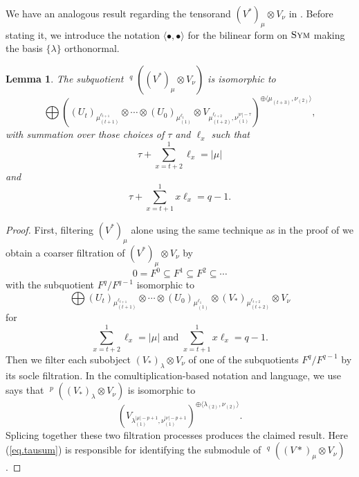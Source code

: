 \documentclass[11pt]{article}
\theoremstyle{plain}
\newtheorem{lemma}{Lemma}[section]
\theoremstyle{nonumberplain}
\theoremstyle{plain}
\theoremstyle{nonumberplain}
\newtheorem{proof}{Proof}
\DeclareMathOperator{\usoc}{\underline{\mathrm{soc}}}
\DeclareMathOperator{\sym}{\cat{Sym}}
\newcommand{\cat}[1]{\textsc{#1}}
\begin{document}
We have an analogous result regarding the tensorand $(V^*)_\mu\otimes V_\nu$ in . Before stating it, we introduce the notation $\langle\bullet,\bullet\rangle$ for the bilinear form on $\sym$ making the basis $\{\lambda\}$ orthonormal. 



\begin{lemma}\label{le.quot_filt'}
  The subquotient  $\usoc^q\left((V^*)_\mu\otimes V_\nu\right)$ is isomorphic to 
  \begin{equation*}
    \bigoplus\left((U_t)_{\mu_{(t+1)}^{\ell_{t+1}}} \otimes\cdots\otimes (U_0)_{\mu_{(1)}^{\ell_1}}\otimes V_{\mu_{(t+2)}^{\ell_{t+2}},\nu_{(1)}^{|\nu|-\tau}}\right)^{\oplus \langle\mu_{(t+3)},\nu_{(2)}\rangle},
  \end{equation*}
with summation over those choices of $\tau$ and $\ell_x$ such that
\begin{equation*}
\tau+\sum^{1}_{x=t+2}\ell_x=|\mu|
\end{equation*}
 and 
 \begin{equation}\label{eq.tausum}
 \tau+\sum^{1}_{x=t+1}x\ell_x=q-1.
\end{equation}
\end{lemma}
\begin{proof}
First, filtering $(V^*)_\mu$ alone using the same
  technique as in the proof of  we
  obtain a coarser filtration of $(V^*)_\mu\otimes V_\nu$ by
  \begin{equation*}
    0=F^0\subseteq F^1\subseteq F^2\subseteq \cdots
  \end{equation*}
  with the subquotient $F^q/F^{q-1}$ isomorphic to
  \begin{equation*}
    \bigoplus (U_t)_{\mu_{(t+1)}^{\ell_{t+1}}}\otimes\cdots\otimes (U_0)_{\mu_{(1)}^{\ell_1}}\otimes (V_*)_{\mu_{(t+2)}^{\ell_{t+2}}}\otimes V_\nu
  \end{equation*}
  for
  \begin{equation*}
    \sum^{1}_{x=t+2} \ell_x = |\mu| \text{ and } \sum^{1}_{x=t+1}x\ell_x=q-1.
  \end{equation*}
  Then we filter each subobject $(V_*)_\lambda\otimes V_\nu$ of
  one of the subquotients $F^q/F^{q-1}$ by its socle filtration.
  In the comultiplication-based notation and language, we use
  \cite[Theorem 2.3]{PS} says that
  $\usoc^p((V_*)_\lambda\otimes V_\nu)$ is isomorphic to
  \begin{equation*}
    \left(V_{\lambda_{(1)}^{|\mu|-p+1},\nu_{(1)}^{|\nu|-p+1}}\right)^{\oplus \langle \lambda_{(2)},\nu_{(2)}\rangle}. 
  \end{equation*}
  Splicing together these two filtration processes produces the
  claimed result.  Here (\ref{eq.tausum}) is responsible for identifying the submodule of $\usoc^q\left((V*)_\mu\otimes V_\nu\right)$.
%
\end{proof}
\end{document}
